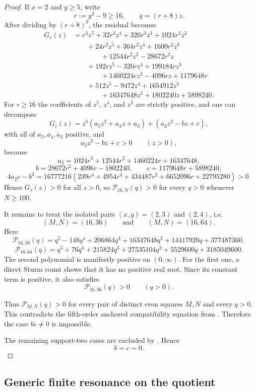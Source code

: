 \documentclass[11pt,reqno]{amsart}
\theoremstyle{definition}
\begin{document}
\begin{proof}
If $x=2$ and $y\ge 5$, write
\[
r:=y^2-9\ge 16,
\qquad
q=(r+8)z.
\]
After dividing by $(r+8)^2$, the residual becomes
\[
\begin{aligned}
G_r(z)
&=r^3z^5+32r^3z^4+320r^3z^3+1024r^3z^2\\
&\qquad +24r^2z^5+364r^2z^4+1600r^2z^3\\
&\qquad\qquad +12544r^2z^2-28672r^2z\\
&\qquad +192rz^5-320rz^4+199184rz^3\\
&\qquad\qquad +1460224rz^2-4096rz+1179648r\\
&\qquad +512z^5-9472z^4+1654912z^3\\
&\qquad\qquad +16347648z^2+1802240z+5898240.
\end{aligned}
\]
For $r\ge 16$ the coefficients of $z^5$, $z^4$, and $z^3$ are strictly positive, and one can
decompose
\[
G_r(z)=z^3(a_5z^2+a_4z+a_3)+(a_2z^2-bz+c),
\]
with all of $a_5,a_4,a_3$ positive, and
\[
a_2z^2-bz+c>0
\qquad (z>0),
\]
because
\[
a_2=1024r^3+12544r^2+1460224r+16347648,
\]
\[
b=28672r^2+4096r-1802240,
\qquad
c=1179648r+5898240,
\]
\[
4a_2c-b^2
=16777216(239r^4+4954r^3+434487r^2+6652096r+22795280)>0.
\]
Hence $G_r(z)>0$ for all $z>0$, so $\mathcal P_{16,N}(q)>0$ for every $q>0$ whenever
$N\ge 100$.

It remains to treat the isolated pairs $(x,y)=(2,3)$ and $(2,4)$, i.e.
\[
(M,N)=(16,36)
\qquad\text{and}\qquad
(M,N)=(16,64).
\]
Here
\[
\mathcal P_{16,36}(q)=q^5-148q^4+206864q^3+16347648q^2+14417920q+377487360,
\]
\[
\mathcal P_{16,64}(q)=q^5+76q^4+215824q^3+27535104q^2+5529600q+3185049600.
\]
The second polynomial is manifestly positive on $(0,\infty)$. For the first one, a direct
Sturm count shows that it has no positive real root. Since its constant term is positive, it
also satisfies
\[
\mathcal P_{16,36}(q)>0
\qquad (q>0).
\]

Thus $\mathcal P_{M,N}(q)>0$ for every pair of distinct even squares $M,N$ and every $q>0$.
This contradicts the fifth-order anchored compatibility equation from
. Therefore the case $bc\neq 0$ is impossible.

The remaining support-two cases are excluded by . Hence
\[
b=c=0.
\]
\end{proof}

\subsection*{Generic finite resonance on the quotient}
\end{document}
